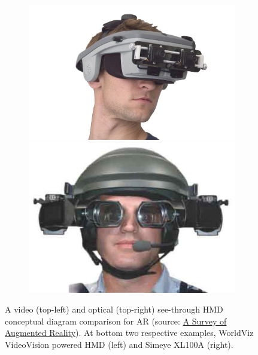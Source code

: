 \begin{figure}
\begin{subfigure}
\vspace*{0.3cm} %
\begin{minipage}[t]{0.49\textwidth}
\includegraphics[width=\linewidth]{pictures/videoST_example}
\end{minipage}
\hspace{\fill}
\begin{minipage}[t]{0.49\textwidth}
\includegraphics[width=\linewidth]{pictures/opticalST_example}
\end{minipage}
\end{subfigure}
\vspace*{-3mm}
\caption{A video (top-left) and optical (top-right) see-through HMD conceptual diagram comparison for AR (source: \href{http://www.cs.unc.edu/~azuma/ARpresence.pdf}{A Survey of Augmented Reality}). At bottom two respective examples, WorldViz VideoVision powered HMD (left) and Simeye XL100A (right).}
\label{fig:video_optical_seethrough_comparison}
\end{figure}

